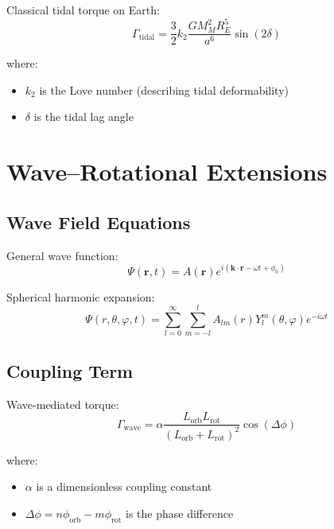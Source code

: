 \documentclass[12pt,a4paper]{article}
\begin{document}
Classical tidal torque on Earth:
\begin{equation}
\Gamma_{\text{tidal}} = \frac{3}{2} k_2 \frac{GM_M^2 R_E^5}{a^6} \sin(2\delta)
\label{eq:tidal_torque}
\end{equation}

where:
\begin{itemize}
    \item $k_2$ is the Love number (describing tidal deformability)
    \item $\delta$ is the tidal lag angle
\end{itemize}

\section{Wave–Rotational Extensions}

\subsection{Wave Field Equations}

General wave function:
\begin{equation}
\Psi(\mathbf{r}, t) = A(\mathbf{r}) e^{i(\mathbf{k} \cdot \mathbf{r} - \omega t + \phi_0)}
\label{eq:wave_function}
\end{equation}

Spherical harmonic expansion:
\begin{equation}
\Psi(r, \theta, \varphi, t) = \sum_{l=0}^{\infty} \sum_{m=-l}^{l} A_{lm}(r) Y_l^m(\theta, \varphi) e^{-i\omega t}
\label{eq:spherical_expansion}
\end{equation}

\subsection{Coupling Term}

Wave-mediated torque:
\begin{equation}
\Gamma_{\text{wave}} = \alpha \frac{L_{\text{orb}} L_{\text{rot}}}{(L_{\text{orb}} + L_{\text{rot}})^2} \cos(\Delta\phi)
\label{eq:wave_torque}
\end{equation}

where:
\begin{itemize}
    \item $\alpha$ is a dimensionless coupling constant
    \item $\Delta\phi = n\phi_{\text{orb}} - m\phi_{\text{rot}}$ is the phase difference
\end{itemize}
\end{document}
